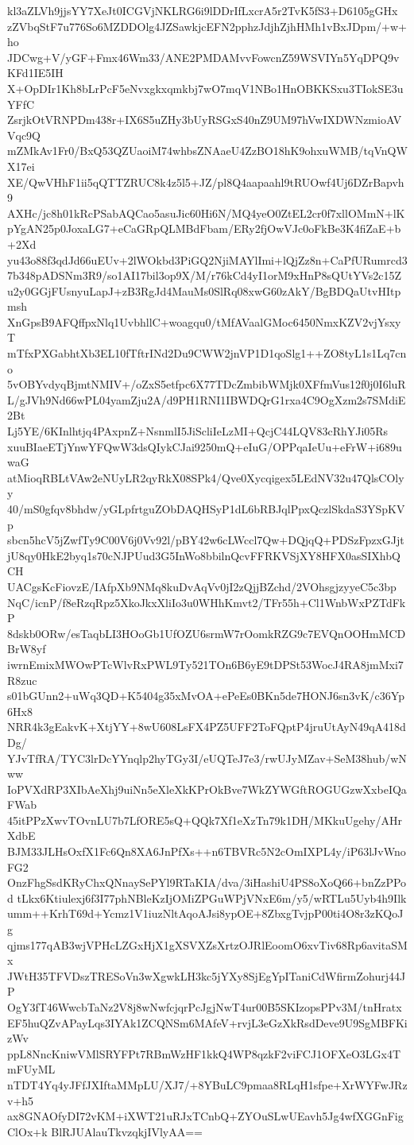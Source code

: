 kl3aZLVh9jjsYY7XeJt0ICGVjNKLRG6i9lDDrIfLxcrA5r2TvK5fS3+D6105gGHx
zZVbqStF7u776So6MZDDOlg4JZSawkjcEFN2pphzJdjhZjhHMh1vBxJDpm/+w+ho
JDCwg+V/yGF+Fmx46Wm33/ANE2PMDAMvvFowcnZ59WSVIYn5YqDPQ9vKFd1IE5IH
X+OpDIr1Kh8bLrPcF5eNvxgkxqmkbj7wO7mqV1NBo1HnOBKKSxu3TIokSE3uYFfC
ZsrjkOtVRNPDm438r+IX6S5uZHy3bUyRSGxS40nZ9UM97hVwIXDWNzmioAVVqc9Q
mZMkAv1Fr0/BxQ53QZUaoiM74whbsZNAaeU4ZzBO18hK9ohxuWMB/tqVnQWX17ei
XE/QwVHhF1ii5qQTTZRUC8k4z5l5+JZ/pl8Q4aapaahl9tRUOwf4Uj6DZrBapvh9
AXHc/jc8h01kRcPSabAQCao5asuJic60Hi6N/MQ4yeO0ZtEL2cr0f7xllOMmN+lK
pYgAN25p0JoxaLG7+eCaGRpQLMBdFbam/ERy2fjOwVJc0oFkBe3K4fiZaE+b+2Xd
yu43o88f3qdJd66uEUv+2lWOkbd3PiGQ2NjiMAYlImi+lQjZz8n+CaPfURumrcd3
7b348pADSNm3R9/so1AI17bil3op9X/M/r76kCd4yI1orM9xHnP8sQUtYVs2c15Z
u2y0GGjFUsnyuLapJ+zB3RgJd4MauMs0SlRq08xwG60zAkY/BgBDQaUtvHItpmsh
XnGpsB9AFQffpxNlq1UvbhllC+woagqu0/tMfAVaalGMoc6450NmxKZV2vjYsxyT
mTfxPXGabhtXb3EL10fTftrINd2Du9CWW2jnVP1D1qoSlg1++ZO8tyL1s1Lq7cno
5vOBYvdyqBjmtNMIV+/oZxS5etfpc6X77TDcZmbibWMjk0XFfmVus12f0j0I6luR
L/gJVh9Nd66wPL04yamZju2A/d9PH1RNI1IBWDQrG1rxa4C9OgXzm2s7SMdiE2Bt
Lj5YE/6KInlhtjq4PAxpnZ+NsnmlI5JiScliIeLzMI+QcjC44LQV83cRhYJi05Rs
xuuBIaeETjYnwYFQwW3dsQIykCJai9250mQ+eIuG/OPPqaIeUu+eFrW+i689uwaG
atMioqRBLtVAw2eNUyLR2qyRkX08SPk4/Qve0Xycqigex5LEdNV32u47QlsCOlyy
40/mS0gfqv8bhdw/yGLpfrtguZObDAQHSyP1dL6bRBJqlPpxQczlSkdaS3YSpKVp
sbcn5hcV5jZwfTy9C00V6j0Vv92l/pBY42w6cLWccl7Qw+DQjqQ+PDSzFpzxGJjt
jU8qy0HkE2byq1s70cNJPUud3G5InWo8bbilnQcvFFRKVSjXY8HFX0asSIXhbQCH
UACgsKcFiovzE/IAfpXb9NMq8kuDvAqVv0jI2zQjjBZchd/2VOhsgjzyyeC5c3bp
NqC/icnP/f8eRzqRpz5XkoJkxXliIo3u0WHhKmvt2/TFr55h+Cl1WnbWxPZTdFkP
8dskb0ORw/esTaqbLI3HOoGb1UfOZU6srmW7rOomkRZG9c7EVQnOOHmMCDBrW8yf
iwrnEmixMWOwPTcWlvRxPWL9Ty521TOn6B6yE9tDPSt53WocJ4RA8jmMxi7R8zuc
s01bGUnn2+uWq3QD+K5404g35xMvOA+ePeEs0BKn5de7HONJ6sn3vK/c36Yp6Hx8
NRR4k3gEakvK+XtjYY+8wU608LsFX4PZ5UFF2ToFQptP4jruUtAyN49qA418dDg/
YJvTfRA/TYC3lrDcYYnqlp2hyTGy3I/eUQTeJ7e3/rwUJyMZav+SeM38hub/wNww
IoPVXdRP3XIbAeXhj9uiNn5eXleXkKPrOkBve7WkZYWGftROGUGzwXxbeIQaFWab
45itPPzXwvTOvnLU7b7LfORE5sQ+QQk7Xf1eXzTn79k1DH/MKkuUgehy/AHrXdbE
BJM33JLHsOxfX1Fc6Qn8XA6JnPfXs++n6TBVRc5N2cOmIXPL4y/iP63lJvWnoFG2
OnzFhgSsdKRyChxQNnaySePYl9RTaKIA/dva/3iHashiU4PS8oXoQ66+bnZzPPod
tLkx6Ktiulexj6f3I77phNBleKzIjOMiZPGuWPjVNxE6m/y5/wRTLu5Uyb4h9Ilk
umm++KrhT69d+Ycmz1V1iuzNltAqoAJsi8ypOE+8ZbxgTvjpP00ti4O8r3zKQoJg
qjms177qAB3wjVPHcLZGxHjX1gXSVXZsXrtzOJRlEoomO6xvTiv68Rp6avitaSMx
JWtH35TFVDszTRESoVn3wXgwkLH3kc5jYXy8SjEgYpITaniCdWfirmZohurj44JP
OgY3fT46WwcbTaNz2V8j8wNwfcjqrPcJgjNwT4ur00B5SKIzopsPPv3M/tnHratx
EF5huQZvAPayLqs3IYAk1ZCQNSm6MAfeV+rvjL3eGzXkRsdDeve9U9SgMBFKizWv
ppL8NncKniwVMlSRYFPt7RBmWzHF1kkQ4WP8qzkF2viFCJ1OFXeO3LGx4TmFUyML
nTDT4Yq4yJFfJXIftaMMpLU/XJ7/+8YBuLC9pmaa8RLqH1sfpe+XrWYFwJRzv+h5
ax8GNAOfyDI72vKM+iXWT21uRJxTCnbQ+ZYOuSLwUEavh5Jg4wfXGGnFigClOx+k
BlRJUAlauTkvzqkjIVlyAA==
